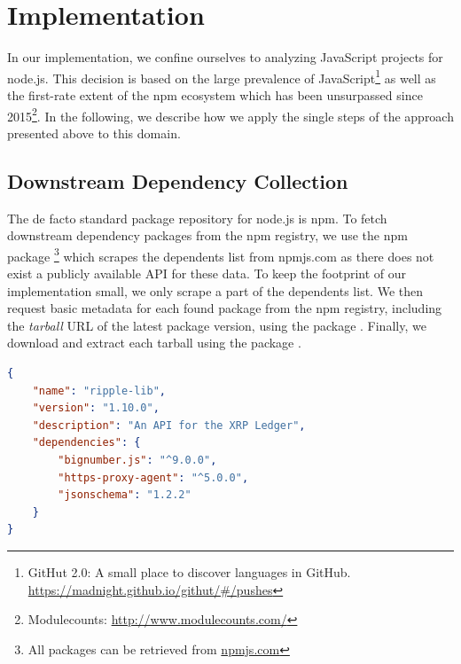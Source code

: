 \section{Implementation}
\label{sec:implementation}

In our implementation, we confine ourselves to analyzing JavaScript projects for node.js.
This decision is based on the large prevalence of JavaScript\footnote{GitHut 2.0: A small place to discover languages in GitHub. \url{https://madnight.github.io/githut/\#/pushes}} as well as the first-rate extent of the npm ecosystem which has been unsurpassed since 2015\footnote{Modulecounts: \url{http://www.modulecounts.com/}}.
In the following, we describe how we apply the single steps of the approach presented above to this domain.

\subsection{Downstream Dependency Collection}
\label{sec:implementation/dependency_collection}

The de facto standard package repository for node.js is npm.
To fetch downstream dependency packages from the npm registry, we use the npm package \footnote{All packages can be retrieved from \url{npmjs.com}} which scrapes the dependents list from npmjs.com as there does not exist a publicly available API for these data.
To keep the footprint of our implementation small, we only scrape a part of the dependents list.
We then request basic metadata for each found package from the npm registry, including the \emph{tarball} URL of the latest package version, using the package .
Finally, we download and extract each tarball using the package .

\begin{lstlisting}[language=json,
	label=sec:implementation/package.json,
	caption={An example \code{package.json} file for the \code{ripple-lib} package specifying multiple dependencies (truncated).},
	float=tpb,
	floatplacement=tbp,
	abovecaptionskip=-5pt
]
{
	"name": "ripple-lib",
	"version": "1.10.0",
	"description": "An API for the XRP Ledger",
	"dependencies": {
		"bignumber.js": "^9.0.0",
		"https-proxy-agent": "^5.0.0",
		"jsonschema": "1.2.2"
	}
}
\end{lstlisting}

